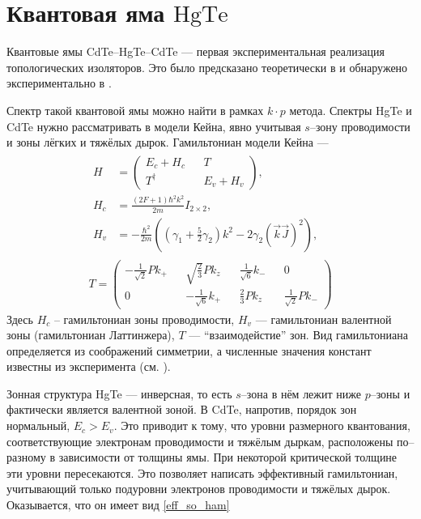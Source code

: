 \section{Квантовая яма $\mathrm{HgTe}$}
Квантовые ямы CdTe--HgTe--CdTe --- первая экспериментальная реализация
топологических изоляторов. Это было предсказано теоретически в \cite{Bernevig2006} и
обнаружено экспериментально в \cite{Konig2007}. 
%

Спектр такой квантовой ямы можно найти в рамках $k\cdot p$ метода. Спектры HgTe и CdTe 
нужно рассматривать в модели Кейна, явно учитывая $s$--зону проводимости и зоны 
лёгких и тяжёлых дырок. Гамильтониан модели Кейна --- 
\begin{equation}
    \begin{gathered}
        \begin{split}
            H &= \begin{pmatrix}
                    E_c + H_c &&  T \\
                    T^\dagger && E_v + H_v
                \end{pmatrix},\\
            H_c& = \frac{(2F+1)\hbar^2k^2}{2m}I_{2\times2},\\
            H_v& = -\frac{\hbar^2}{2m}((\gamma_1 + \frac52\gamma_2)k^2 - 
                2\gamma_2(\vec{k}\vec{J})^2), 
        \end{split}\\
        T = \begin{pmatrix}
                 -\frac{1}{\sqrt{2}}Pk_{+} && \sqrt{\frac23}Pk_z && 
                                        \frac{1}{\sqrt{6}}k_{-} && 0  \\
                  0 && -\frac{1}{\sqrt{6}}k_{+} && \frac{2}{3}P k_z 
                                        && \frac{1}{\sqrt{2}}P k_{-}
            \end{pmatrix}
    \end{gathered}
\end{equation}
Здесь $H_c$ -- гамильтониан зоны проводимости, $H_v$ --- гамильтониан валентной зоны
(гамильтониан Латтинжера), $T$ --- ``взаимодейстие'' зон. Вид гамильтониана определяется
из соображений симметрии, а численные значения констант известны из эксперимента 
(см. \cite{Novik2005}).

Зонная структура HgTe --- инверсная, то есть $s$--зона в нём лежит ниже $p$--зоны и
фактически является валентной зоной.
В CdTe, напротив, порядок зон нормальный, $E_c > E_v$. Это приводит к тому, что
уровни размерного квантования, соответствующие электронам проводимости и тяжёлым 
дыркам, расположены по--разному в зависимости от толщины ямы. При некоторой критической
толщине эти уровни пересекаются. Это позволяет написать эффективный гамильтониан, учитывающий
только подуровни электронов проводимости и тяжёлых дырок. Оказывается, что он имеет вид
\eqref{eff_so_ham}
